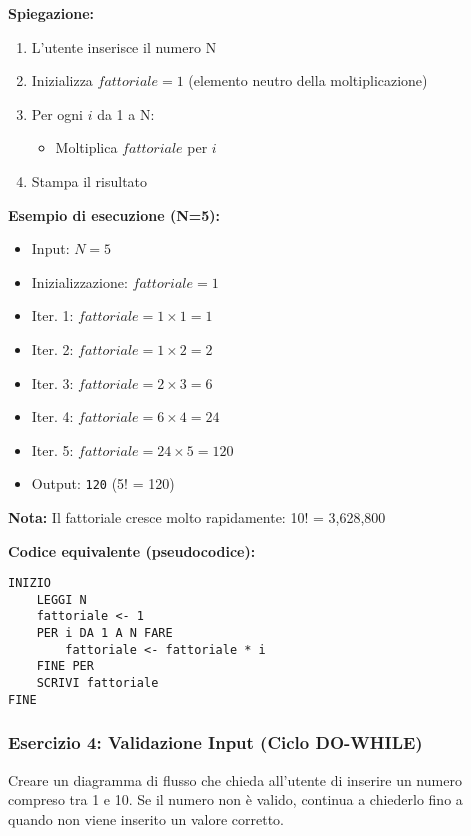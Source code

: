 \documentclass[a4paper,16pt]{article}
\begin{document}
\textbf{Spiegazione:}
\begin{enumerate}
    \item L'utente inserisce il numero N
    \item Inizializza $fattoriale = 1$ (elemento neutro della moltiplicazione)
    \item Per ogni $i$ da 1 a N:
    \begin{itemize}
        \item Moltiplica $fattoriale$ per $i$
    \end{itemize}
    \item Stampa il risultato
\end{enumerate}

\textbf{Esempio di esecuzione (N=5):}
\begin{itemize}
    \item Input: $N = 5$
    \item Inizializzazione: $fattoriale = 1$
    \item Iter. 1: $fattoriale = 1 \times 1 = 1$
    \item Iter. 2: $fattoriale = 1 \times 2 = 2$
    \item Iter. 3: $fattoriale = 2 \times 3 = 6$
    \item Iter. 4: $fattoriale = 6 \times 4 = 24$
    \item Iter. 5: $fattoriale = 24 \times 5 = 120$
    \item Output: \texttt{120} (5! = 120)
\end{itemize}

\textbf{Nota:} Il fattoriale cresce molto rapidamente: 10! = 3,628,800

\textbf{Codice equivalente (pseudocodice):}
\begin{lstlisting}
INIZIO
    LEGGI N
    fattoriale <- 1
    PER i DA 1 A N FARE
        fattoriale <- fattoriale * i
    FINE PER
    SCRIVI fattoriale
FINE
\end{lstlisting}

\newpage
\subsubsection{Esercizio 4: Validazione Input (Ciclo DO-WHILE)}

\begin{tcolorbox}[colback=blue!5!white,colframe=blue!75!black,title=Traccia]
Creare un diagramma di flusso che chieda all'utente di inserire un numero compreso tra 1 e 10. Se il numero non è valido, continua a chiederlo fino a quando non viene inserito un valore corretto.
\end{tcolorbox}
\end{document}
